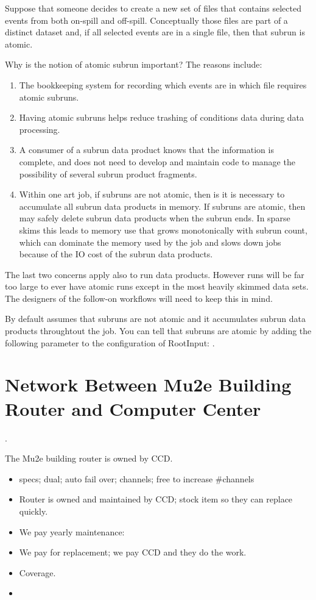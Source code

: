 Suppose that someone decides to create a new set of files that contains selected events from both on-spill
and off-spill.  Conceptually those files are part of a distinct dataset and, if all selected events
are in a single file, then that subrun is atomic.

Why is the notion of atomic subrun important?  The reasons include:
\begin{enumerate}
\item The bookkeeping system for recording which events are in which file requires atomic subruns.
\item Having atomic subruns helps reduce trashing of conditions data during data processing.
\item A consumer of a subrun data product knows that the information is complete, and does not need
  to develop and maintain code to manage the possibility of several subrun product fragments.
\item Within one art job, if subruns are not atomic,
  then is it is necessary to accumulate all subrun data products in memory.
  If subruns are atomic, then \art may safely delete subrun data products when the subrun ends.
  In sparse skims this leads to memory use that grows monotonically with subrun count,
  which can dominate the memory used by the job and slows down jobs because of the IO cost of
  the subrun data products.
\end{enumerate}

The last two concerns apply also to run data products.
However runs will be far too large to ever have atomic runs except in the most heavily skimmed data sets.
The designers of the follow-on workflows will need to keep this in mind.

By default \art assumes that subruns are not atomic and it accumulates subrun data products throughtout the job.
You can tell \art that subruns are atomic by adding the following parameter to the configuration of
RootInput: .


\chapter{Network Between Mu2e Building Router and Computer Center}
\label{app:RouterAndNetwork}.

The Mu2e building router is owned by CCD.
\begin{itemize}
\item specs; dual; auto fail over; channels; free to increase \#channels
\item Router is owned and maintained by CCD; stock item so they can replace quickly.
\item We pay yearly maintenance: 
\item We pay for replacement; we pay CCD and they do the work. 
\item {} Coverage.
\item {}
\end{itemize}


